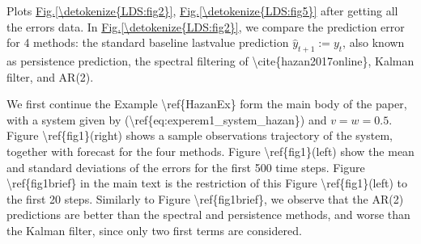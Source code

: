 \documentclass[letterpaper,10pt,english]{sphinxmanual}
\begin{document}

\begin{fulllineitems}
\label{\detokenize{LDS:LDS.OnlineLDS_library.p3_for_test_identification2}}
\sphinxAtStartPar
Plots \hyperref[\detokenize{LDS:fig2}]{Fig.\@ \ref{\detokenize{LDS:fig2}}}, \hyperref[\detokenize{LDS:fig5}]{Fig.\@ \ref{\detokenize{LDS:fig5}}} after getting all the errors data.
In \hyperref[\detokenize{LDS:fig2}]{Fig.\@ \ref{\detokenize{LDS:fig2}}}, we compare the prediction error for 4 methods:
the standard baseline last\sphinxhyphen{}value prediction \(\hat{y}_{t+1} := y_t\), also
known as persistence prediction, the spectral filtering of
\textbackslash{}cite\{hazan2017online\}, Kalman filter, and AR(2).

\sphinxAtStartPar
We first continue the Example \textbackslash{}ref\{HazanEx\} form the main body of the
paper, with a system given by (\textbackslash{}ref\{eq:experem1\_system\_hazan\}) and
\(v=w=0.5\). Figure \textbackslash{}ref\{fig1\}(right) shows a sample observations
trajectory of the system, together with forecast for the four methods.
Figure \textbackslash{}ref\{fig1\}(left) show the mean and standard deviations of the
errors for the first 500 time steps. Figure \textbackslash{}ref\{fig1brief\} in the main
text is the restriction of this Figure \textbackslash{}ref\{fig1\}(left) to the first 20
steps. Similarly to Figure \textbackslash{}ref\{fig1brief\}, we observe that the AR(2)
predictions are better than the spectral and persistence methods, and
worse than the Kalman filter, since only two first terms are considered.

\end{fulllineitems}
\end{document}
